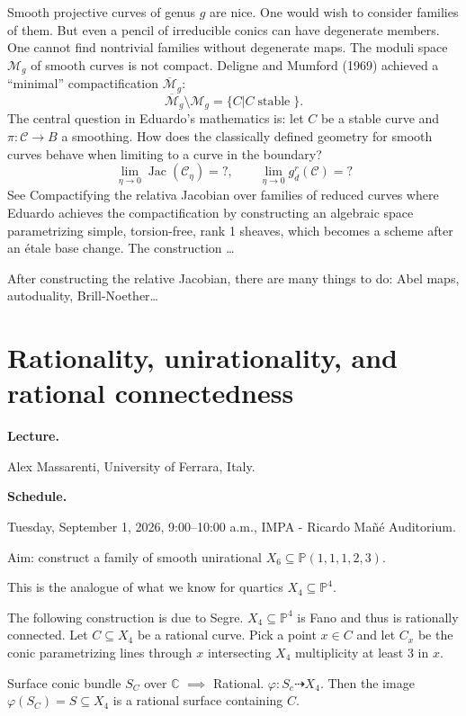 Smooth projective curves of genus $g$
are nice. One would wish to consider
families
of them. But even a pencil of
irreducible conics can have degenerate
members. One cannot find nontrivial
families without degenerate maps.
The moduli space $\mathcal{M}_g$ of smooth
curves is not compact. Deligne and Mumford
(1969) achieved a ``minimal''
compactification
$\overline{\mathcal{M}}_g$:
$$
\overline{\mathcal{M}}_g\setminus\mathcal{M}_g
=
\{C|C \operatorname{stable}\}.
$$
The central question in Eduardo's
mathematics
is: let $C$ be a stable curve
and $\pi:\mathcal{C} \to B$ a smoothing.
How does the classically defined
geometry for smooth curves
behave when limiting to a curve in the
boundary?
$$
\lim_{\eta \to 0}
\operatorname{Jac}(\mathcal{C}_\eta)=?,\qquad 
\lim_{\eta\to 0} g_d^r(\mathcal{C})=?
$$
See Compactifying the relativa Jacobian over
families of reduced curves where Eduardo
achieves the compactification by
constructing an algebraic space
parametrizing simple, torsion-free, rank 1
sheaves, which becomes a scheme after an
étale base change. The construction …

After constructing the relative Jacobian,
there are many things to do: Abel maps,
autoduality, Brill-Noether…

\section{Rationality, unirationality, and
rational connectedness}
\label{section-rationality-unirationality}

\medskip\noindent
{\bf Lecture.}

Alex Massarenti,
University of Ferrara, Italy.

\medskip\noindent
{\bf Schedule.}

Tuesday, September 1, 2026,
9:00--10:00 a.m.,
IMPA - Ricardo Ma\~n\'e Auditorium.

\medskip\noindent
Aim: construct a family of smooth
unirational
$X_6 \subseteq \mathbb{P}(1,1,1,2,3)$.

This is the analogue of what we know for
quartics $X_4 \subseteq \mathbb{P}^4$.

The following construction is due to Segre.
$X_4 \subseteq \mathbb{P}^4$ is Fano
and thus is rationally connected.
Let $C \subseteq X_4$ be a rational curve.
Pick a point $x \in C$ and
let $C_x$ be the conic parametrizing
lines through $x$ intersecting $X_4$
multiplicity at least 3 in $x$.

Surface conic bundle $S_C$
over $\mathbb{C}$ $\implies $
Rational.
$\varphi:S_c \dashrightarrow
X_4$. Then the image $\varphi(S_C) = S
\subseteq X_4$ is a rational surface
containing $C$.

